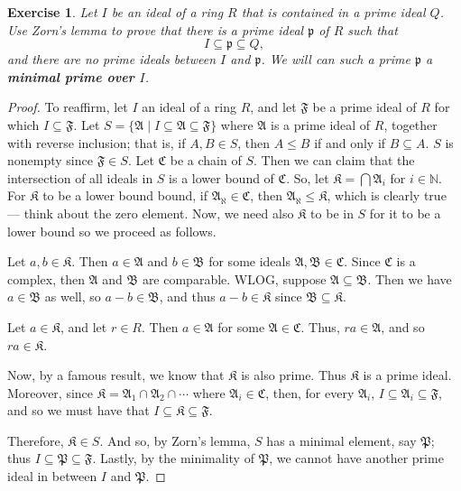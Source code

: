 \documentclass[12pt,reqno]{amsart}
\theoremstyle{plain}
\newtheorem{exercise}{Exercise}
\newcommand{\nn}{\mathbb N}
\newcommand{\idealp}{\mathfrak{p}}
\newcommand{\idealP}{\mathfrak{P}}
\newcommand{\idealA}{\mathfrak{A}}
\newcommand{\idealB}{\mathfrak{B}}
\newcommand{\idealF}{\mathfrak{F}}
\newcommand{\C}{\mathfrak{C}}
\begin{document}
\begin{exercise} \textup{ Let $I$ be an ideal of a ring $R$ that is contained in a prime ideal $Q$. Use Zorn's lemma to prove that there is a prime ideal $\idealp$ of $R$ such that \[
I \subseteq \idealp \subseteq Q, 
\]
and there are \textit{no} prime ideals between $I$ and $\idealp$. We will can such a prime $\idealp$ a \textbf{minimal prime over $I$}. }
\end{exercise} 
\begin{proof} To reaffirm, let $I$ an ideal of a ring $R$, and let $\idealF$ be a prime  ideal of $R$ for which $I \subseteq \idealF$. Let $S = \{ \idealA \mid I \subseteq \idealA \subseteq \idealF \}$ where $\idealA$ is a prime ideal of $R$, together with reverse inclusion; that is, if $A, B \in S$, then $A \leq B$ if and only if $B \subseteq A$. $S$ is nonempty since $\idealF \in S$. Let $\C$ be a chain of $S$. Then we can claim that the intersection of all ideals in $S$ is a lower bound of $\C$. So, let $\mathfrak{K} = \bigcap \idealA_i$ for $i \in \nn$. For $\mathfrak{K}$ to be a lower bound bound, if $\idealA_{\aleph} \in \C$, then $\idealA _{\aleph} \leq \mathfrak{K}$, which is clearly true — think about the zero element. Now, we need also $\mathfrak{K}$ to be in $S$ for it to be a lower bound so we proceed as follows. 

Let $a, b \in \mathfrak{K}$. Then $a \in \idealA$ and $b \in \idealB$ for some ideals $\idealA, \idealB \in \C$. Since $\C$ is a complex, then $\idealA$ and $\idealB$ are comparable. WLOG, suppose $\idealA \subseteq \idealB$. Then we have $a \in \idealB$ as well, so $a-b \in \idealB$, and thus $a-b \in \mathfrak{K}$ since $\idealB \subseteq \mathfrak{K}$. 

Let $a \in \mathfrak{K}$, and let $r \in R$. Then $a \in \idealA$ for some $\idealA \in \C$. Thus, $ra \in \idealA$, and so $ra \in \mathfrak{K}$.

Now, by a famous result, we know that $ \mathfrak{K}$ is also prime. Thus $ \mathfrak{K}$ is a prime ideal. Moreover, since $ \mathfrak{K} = \idealA_1 \cap \idealA_2 \cap \cdots$ where $\idealA_i \in \C$, then, for every $\idealA_i$, $I \subseteq \idealA_i \subseteq \idealF$, and so we must have that $I \subseteq \mathfrak{K} \subseteq \idealF$. 

Therefore, $\mathfrak{K} \in S$. And so, by Zorn's lemma, $S$ has a minimal element, say $\idealP$; thus $I \subseteq \idealP \subseteq \idealF$. Lastly, by the minimality of $\idealP$, we cannot have another prime ideal in between $I$ and $\idealP$. 
\end{proof}
\end{document}
